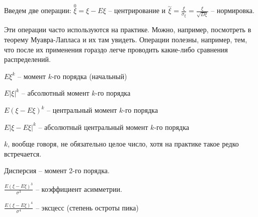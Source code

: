 Введем две операции: $\stackrel{0}{\xi} = \xi - E\xi$  -- центрирование и $\stackrel{\sim}{\xi} = \frac{\xi}{\sigma_\xi} = \frac{\xi}{\sqrt{D\xi}}$ -- нормировка.

Эти операции часто используются на практике. Можно, например, посмотреть в теорему Муавра-Лапласа и их там увидеть.
Операции полезны, например, тем, что после их применения гораздо легче проводить какие-либо сравнения распределений.

\begin{Def}
$E\xi^k$ -- момент $k$-го порядка (начальный)

$E|\xi|^k$ -- абсолютный момент $k$-го порядка

$E(\xi - E\xi)^k$ -- центральный момент $k$-го порядка

$E|\xi - E\xi|^k$ -- абсолютный центральный момент $k$-го порядка
\end{Def}
\begin{Rem}
$k$, вообще говоря, не обязательно целое число, хотя на практике такое редко встречается.
\end{Rem}
\begin{Rem}
Дисперсия -- момент 2-го порядка.
\end{Rem}
\begin{Rem}
$\frac{E(\xi - E\xi)^3}{\sigma^3}$ -- коэффициент асимметрии.
\end{Rem}
\begin{Rem}
$\frac{E(\xi - E\xi)^4}{\sigma^4}$ -- эксцесс (степень остроты пика)
\end{Rem}
